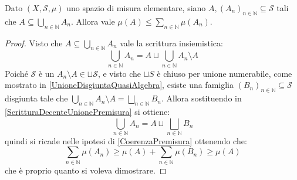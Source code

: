 \begin{lemma}\label{PiuCheMonotonaPremisura}
	Dato $(X,\mathcal S,\mu)$ uno spazio di misura elementare, siano $A,(A_n)_{n\in\mathbb N}\subseteq \mathcal S$ tali che $A\subseteq\bigcup_{n\in\mathbb N}A_n$.
	Allora vale $\mu(A)\le \sum_{n\in\mathbb N}\mu(A_n)$.
\end{lemma}
\begin{proof}
	Visto che $A\subseteq\bigcup_{n\in\mathbb N}A_n$ vale la scrittura insiemistica:
	\begin{equation}\label{ScritturaDecenteUnionePremisura}
		\bigcup_{n\in\mathbb N}A_n=A\sqcup\bigcup_{n\in\mathbb N}A_n\setminus A
	\end{equation}
	Poiché $\mathcal S$ è un \semiring{} $A_n\setminus A\in \sqcup \mathcal S$, e visto che $\sqcup S$ è chiuso per unione numerabile, come mostrato in \cref{UnioneDisgiuntaQuasiAlgebra}, esiste una famiglia $(B_n)_{n\in\mathbb N}\subseteq\mathcal S$ disgiunta tale che $\bigcup_{n\in\mathbb N}A_n\setminus A=\bigsqcup_{n\in\mathbb N}B_n$.
	Allora sostituendo in \cref{ScritturaDecenteUnionePremisura} si ottiene:
	\begin{equation*}
		\bigcup_{n\in\mathbb N}A_n=A\sqcup\bigsqcup_{n\in\mathbb N}B_n
	\end{equation*}
	quindi si ricade nelle ipotesi di \cref{CoerenzaPremisura} ottenendo che:
	\begin{equation*}
		\sum_{n\in\mathbb N}\mu(A_n)\ge \mu(A)+\sum_{n\in\mathbb N}\mu(B_n)\ge \mu(A)
	\end{equation*}
	che è proprio quanto si voleva dimostrare.

\end{proof}



